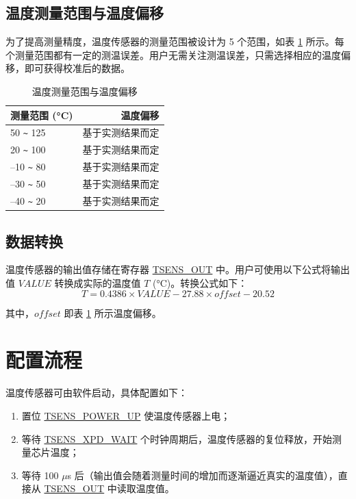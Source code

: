 \documentclass[main\_\_CN.tex]{subfiles}
\begin{document}
\subsection{温度测量范围与温度偏移}

为了提高测量精度，温度传感器的测量范围被设计为 5 个范围，如表 \ref{tab:tsensor-dac} 所示。每个测量范围都有一定的测温误差。用户无需关注测温误差，只需选择相应的温度偏移，即可获得校准后的数据。


\begin{longtable}[c]{|l|r|}
    \caption{温度测量范围与温度偏移}
    \label{tab:tsensor-dac}
    \\\hline
    \rowcolor{lightgray}
    测量范围 (°C)  & 温度偏移 \\\hline
    50 \verb+~+ 125 & 基于实测结果而定 \\\hline
    20 \verb+~+ 100 &  基于实测结果而定 \\\hline
    –10 \verb+~+ 80 &  基于实测结果而定 \\\hline
    –30 \verb+~+ 50 &  基于实测结果而定 \\\hline
    –40 \verb+~+ 20 &  基于实测结果而定 \\\hline
\end{longtable}

\subsection{数据转换}

温度传感器的输出值存储在寄存器 \hyperref[fielddesc:TSENSOUT]{TSENS\_OUT} 中。用户可使用以下公式将输出值 \(VALUE\) 转换成实际的温度值 \(T\) (°C)。转换公式如下：
\[
        T = 0.4386 \times VALUE - 27.88 \times offset - 20.52
\]

其中，\(offset\) 即表 \ref{tab:tsensor-dac} 所示温度偏移。


\section{配置流程}

温度传感器可由软件启动，具体配置如下：

\begin{enumerate}
    \item 置位 \hyperref[fielddesc:TSENSPOWERUP]{TSENS\_POWER\_UP} 使温度传感器上电；
    \item 等待 \hyperref[fielddesc:TSENSXPDWAIT]{TSENS\_XPD\_WAIT} 个时钟周期后，温度传感器的复位释放，开始测量芯片温度；
    \item 等待 100 $\mu$s 后（输出值会随着测量时间的增加而逐渐逼近真实的温度值），直接从 \hyperref[fielddesc:TSENSOUT]{TSENS\_OUT} 中读取温度值。
\end{enumerate}
\end{document}
